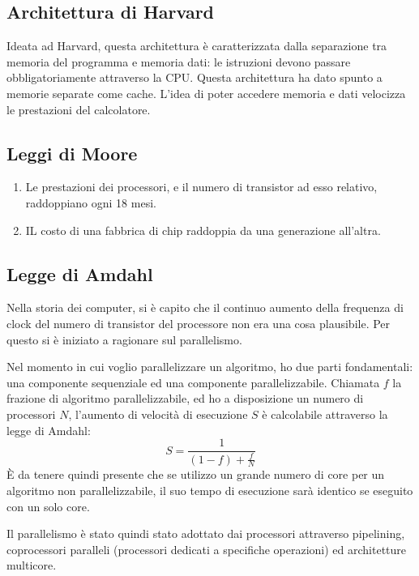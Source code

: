 \documentclass[../ace.tex]{subfiles}
\begin{document}
\subsection{Architettura di Harvard}
\begin{figure}[h]
    \centering
\end{figure}

\noindent
Ideata ad Harvard, questa architettura è caratterizzata dalla separazione tra memoria del programma e memoria dati: le istruzioni
devono passare obbligatoriamente attraverso la CPU.
Questa architettura ha dato spunto a memorie separate come cache.
L'idea di poter accedere memoria e dati velocizza le prestazioni del calcolatore.

\subsection{Leggi di Moore}
\begin{enumerate}
    \item Le prestazioni dei processori, e il numero di transistor ad esso relativo, raddoppiano ogni 18 mesi.
    \item IL costo di una fabbrica di chip raddoppia da una generazione all'altra.
\end{enumerate}

\subsection{Legge di Amdahl}
Nella storia dei computer, si è capito che il continuo aumento della frequenza di clock del numero di transistor del processore
non era una cosa plausibile. Per questo si è iniziato a ragionare sul parallelismo.

Nel momento in cui voglio parallelizzare un algoritmo, ho due parti fondamentali: una componente sequenziale ed una componente
parallelizzabile.
Chiamata $f$ la frazione di algoritmo parallelizzabile, ed ho a disposizione un numero di processori $N$, l'aumento di
velocità di esecuzione $S$ è calcolabile attraverso la legge di Amdahl:
\[
    S = \frac{1}{(1 - f) + \frac{f}{N}}
\]
È da tenere quindi presente che se utilizzo un grande numero di core per un algoritmo non parallelizzabile, il suo tempo di
esecuzione sarà identico se eseguito con un solo core.

Il parallelismo è stato quindi stato adottato dai processori attraverso pipelining, coprocessori paralleli (processori dedicati
a specifiche operazioni) ed architetture multicore.
\end{document}
